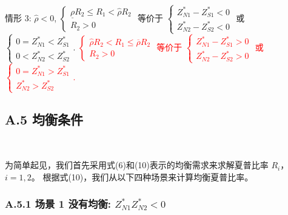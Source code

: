 \documentclass[10.0pt]{article}
\newcommand{\hhred}{\textcolor{red}}
\begin{document}
情形 3: $ {\hat \rho} < 0 $, $ \left\{ \begin{matrix} \underline{\rho} R_2 \leqslant R_1 < {\hat \rho} R_2 \\ R_2 > 0 \end{matrix} \right. $ 等价于 $ \left\{ \begin{matrix} Z_{N 1}^* - Z_{S 1}^* < 0 \\ Z_{N 2}^* - Z_{S 2}^* < 0 \end{matrix} \right. $ 或 $ \left\{ \begin{matrix} 0 = Z_{N 1}^* < Z_{S 1}^* \\ 0 < Z_{N 2}^* < Z_{S 2}^* \end{matrix} \right. $. \hhred{$ \left\{ \begin{matrix} {\hat \rho} R_2 < R_1 \leqslant \overline{\rho} R_2 \\ R_2 > 0 \end{matrix} \right. $ 等价于 $ \left\{ \begin{matrix} Z_{N 1}^* - Z_{S 1}^* > 0 \\ Z_{N 2}^* - Z_{S 2}^* > 0 \end{matrix} \right. $ 或 $ \left\{ \begin{matrix} 0 = Z_{N 1}^* > Z_{S 1}^* \\ Z_{N 2}^* > Z_{S 2}^* \end{matrix} \right. $.}

\subsection*{A.5 \quad 均衡条件}

\quad \ 


为简单起见，我们首先采用式(6)和(10)表示的均衡需求来求解夏普比率 $ R_i $，$ i = 1, 2 $。 根据式(10)，我们从以下四种场景来计算均衡夏普比率。

\subsubsection*{A.5.1 \quad 场景 1 没有均衡: $ Z_{N 1}^* Z_{N 2}^* < 0 $}
\end{document}
